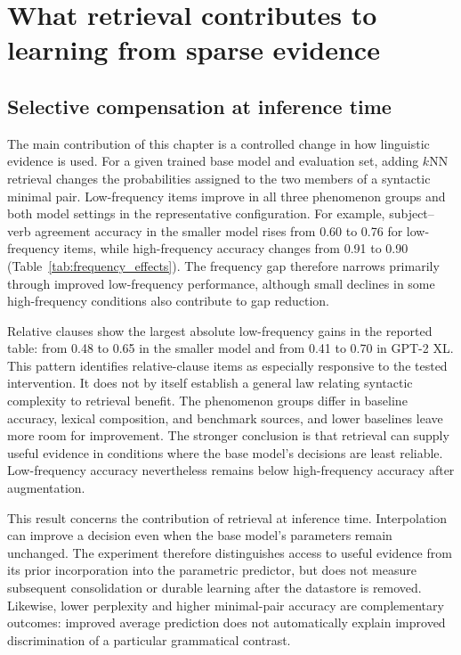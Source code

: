 \section{What retrieval contributes to learning from sparse evidence}
\label{sec:ch4:thesis-discussion}

\subsection{Selective compensation at inference time}

The main contribution of this chapter is a controlled change in how linguistic evidence is used. For a given trained base model and evaluation set, adding $k$NN retrieval changes the probabilities assigned to the two members of a syntactic minimal pair. Low-frequency items improve in all three phenomenon groups and both model settings in the representative configuration. For example, subject--verb agreement accuracy in the smaller model rises from 0.60 to 0.76 for low-frequency items, while high-frequency accuracy changes from 0.91 to 0.90 (Table~\ref{tab:frequency_effects}). The frequency gap therefore narrows primarily through improved low-frequency performance, although small declines in some high-frequency conditions also contribute to gap reduction.

Relative clauses show the largest absolute low-frequency gains in the reported table: from 0.48 to 0.65 in the smaller model and from 0.41 to 0.70 in GPT-2 XL. This pattern identifies relative-clause items as especially responsive to the tested intervention. It does not by itself establish a general law relating syntactic complexity to retrieval benefit. The phenomenon groups differ in baseline accuracy, lexical composition, and benchmark sources, and lower baselines leave more room for improvement. The stronger conclusion is that retrieval can supply useful evidence in conditions where the base model's decisions are least reliable. Low-frequency accuracy nevertheless remains below high-frequency accuracy after augmentation.

This result concerns the contribution of retrieval at inference time. Interpolation can improve a decision even when the base model's parameters remain unchanged. The experiment therefore distinguishes access to useful evidence from its prior incorporation into the parametric predictor, but does not measure subsequent consolidation or durable learning after the datastore is removed. Likewise, lower perplexity and higher minimal-pair accuracy are complementary outcomes: improved average prediction does not automatically explain improved discrimination of a particular grammatical contrast.

